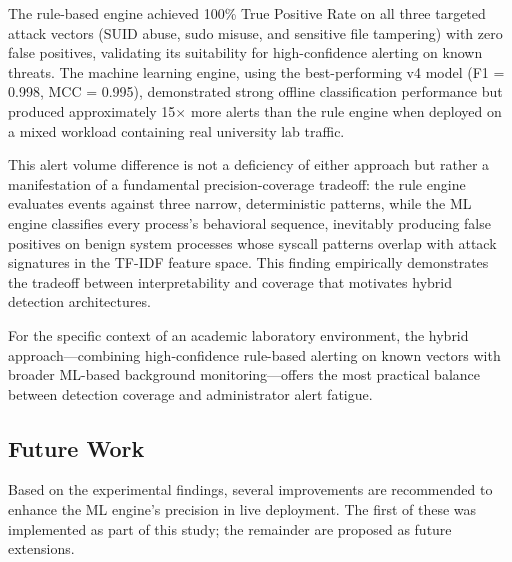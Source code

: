 \documentclass[journal]{./IEEEtran}
\begin{document}
The rule-based engine achieved 100\% True Positive Rate on all three targeted attack vectors (SUID abuse, sudo misuse, and sensitive file tampering) with zero false positives, validating its suitability for high-confidence alerting on known threats. The machine learning engine, using the best-performing v4 model (F1 = 0.998, MCC = 0.995), demonstrated strong offline classification performance but produced approximately 15$\times$ more alerts than the rule engine when deployed on a mixed workload containing real university lab traffic.

This alert volume difference is not a deficiency of either approach but rather a manifestation of a fundamental precision-coverage tradeoff: the rule engine evaluates events against three narrow, deterministic patterns, while the ML engine classifies every process's behavioral sequence, inevitably producing false positives on benign system processes whose syscall patterns overlap with attack signatures in the TF-IDF feature space. This finding empirically demonstrates the tradeoff between interpretability and coverage that motivates hybrid detection architectures.

For the specific context of an academic laboratory environment, the hybrid approach---combining high-confidence rule-based alerting on known vectors with broader ML-based background monitoring---offers the most practical balance between detection coverage and administrator alert fatigue.

\subsection{Future Work}

Based on the experimental findings, several improvements are recommended to enhance the ML engine's precision in live deployment. The first of these was implemented as part of this study; the remainder are proposed as future extensions.
\end{document}
